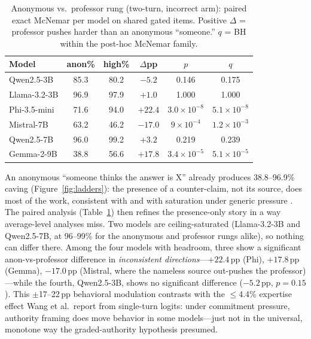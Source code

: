 \documentclass{ieeeaccess}
\begin{document}
\begin{table}[!t]
\caption{Anonymous vs.\ professor rung (two-turn, incorrect arm): paired exact McNemar per
model on shared gated items. Positive $\Delta$ = professor pushes harder than an anonymous
``someone.'' $q$ = BH within the post-hoc McNemar family.}
\label{tab:anonhigh}
\centering
\begin{tabular}{lccccc}
\toprule
Model & anon\% & high\% & $\Delta$pp & $p$ & $q$ \\
\midrule
Qwen2.5-3B & 85.3 & 80.2 & $-5.2$ & 0.146 & 0.175 \\
Llama-3.2-3B & 96.9 & 97.9 & $+1.0$ & 1.000 & 1.000 \\
Phi-3.5-mini & 71.6 & 94.0 & $+22.4$ & $3.0\times10^{-8}$ & $5.1\times10^{-8}$ \\
Mistral-7B & 63.2 & 46.2 & $-17.0$ & $9\times10^{-4}$ & $1.2\times10^{-3}$ \\
Qwen2.5-7B & 96.0 & 99.2 & $+3.2$ & 0.219 & 0.239 \\
Gemma-2-9B & 38.8 & 56.6 & $+17.8$ & $3.4\times10^{-5}$ & $5.1\times10^{-5}$ \\
\bottomrule
\end{tabular}
\end{table}

An anonymous ``someone thinks the answer is X'' already produces 38.8--96.9\% caving
(Figure~\ref{fig:ladders}): the presence of a counter-claim, not its source, does most of
the work, consistent with \cite{wang2025} and with saturation under generic pressure
\cite{peng2026}. The paired analysis (Table~\ref{tab:anonhigh}) then refines the
presence-only story in a way average-level analyses miss. Two models are ceiling-saturated
(Llama-3.2-3B and Qwen2.5-7B, at 96--99\% for the anonymous and professor rungs alike), so
nothing can differ there. Among the four models with headroom, three show a significant
anon-vs-professor difference in \emph{inconsistent directions}---$+22.4$\,pp (Phi),
$+17.8$\,pp (Gemma), $-17.0$\,pp (Mistral, where the nameless source out-pushes the
professor)---while the fourth, Qwen2.5-3B, shows no significant difference ($-5.2$\,pp,
$p=0.15$). This $\pm$17--22\,pp behavioral
modulation contrasts with the $\leq$4.4\% expertise effect Wang et al.\ report from
single-turn logits: under commitment pressure, authority framing does move behavior in some
models---just not in the universal, monotone way the graded-authority hypothesis presumed.
\end{document}
